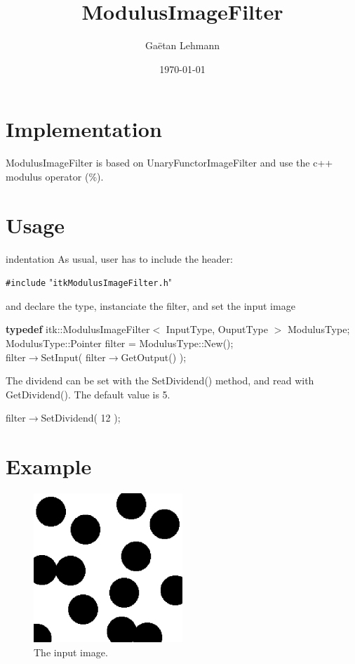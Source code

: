 \documentclass[12pt]{article}
\title{ModulusImageFilter}
\author{Ga\"etan Lehmann}
\date{\today}
\begin{document}
\maketitle


\section{Implementation}
ModulusImageFilter is based on UnaryFunctorImageFilter and use the c++ modulus operator (\%).

\section{Usage}
\expandafter\ifx\csname indentation\endcsname\relax%
\newlength{\indentation}\fi
\setlength{\indentation}{0.5em}
As usual, user has to include the header:
\begin{flushleft}
{\tt \#include} "{\tt{}itkModulusImageFilter.h}"\mbox{}\\
\end{flushleft}
and declare the type, instanciate the filter, and set the input image
\begin{flushleft}
{\bf typedef} itk::ModulusImageFilter$<$ InputType, OuputType $>$ ModulusType;\mbox{}\\
ModulusType::Pointer filter = ModulusType::New();\mbox{}\\
filter$\rightarrow$SetInput( filter$\rightarrow$GetOutput() );\mbox{}\\
\end{flushleft}

The dividend can be set with the SetDividend() method, and read with GetDividend(). The default value is 5.

\begin{flushleft}
filter$\rightarrow$SetDividend( 12 );\mbox{}\\
\end{flushleft}

\section{Example}
\begin{figure}
\centering
\includegraphics[width=0.5\textwidth]{Spots.eps}
\caption{The input image.}
\end{figure}
\end{document}

